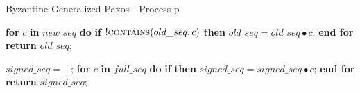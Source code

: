 \begin{algorithm}
	\caption{Byzantine Generalized Paxos - Process p}
	\begin{algorithmic}[1]
		
		\State \textbf{for} $c$ \textbf{in} $new\_seq$ \textbf{do} 
		\State \hspace{\algorithmicindent} \textbf{if} $!\Call{contains}{old\_seq,c}$ \textbf{then}
		\State \hspace{\algorithmicindent}\hspace{\algorithmicindent}\hspace{\algorithmicindent} $old\_seq =  old\_seq \bullet c$;
		\State \textbf{end for}
		\State \textbf{return} $old\_seq$;
		\EndFunction
		
		\State
		\State $signed\_seq = \bot$;
		\State \textbf{for} $c$ \textbf{in} $full\_seq$ \textbf{do}
		\State \hspace{\algorithmicindent} \textbf{if}  \textbf{then}
		\State \hspace{\algorithmicindent}\hspace{\algorithmicindent} $signed\_seq = signed\_seq \bullet c$;
		\State \textbf{end for}
		\State \textbf{return} $signed\_seq$;
		\EndFunction
	\end{algorithmic}
\end{algorithm}

